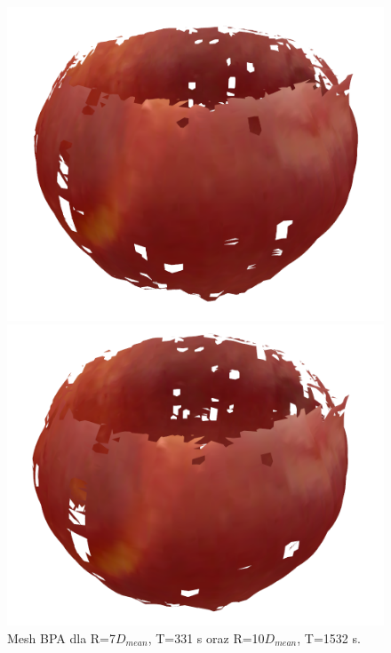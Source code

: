 \begin{figure}[H]
\centering
    \begin{minipage}[b]{0.45\linewidth}
        \includegraphics[scale=0.3]{bpaApple7x.PNG}
    \end{minipage}
\quad
    \begin{minipage}[b]{0.45\linewidth}
        \includegraphics[scale=0.3]{bpaApple10x.PNG}
    \end{minipage}
\caption{Mesh BPA dla R=7$D_{mean}$, T=331 s oraz R=10$D_{mean}$, T=1532 s.}
\label{fig:appleComparison2}
\end{figure}

